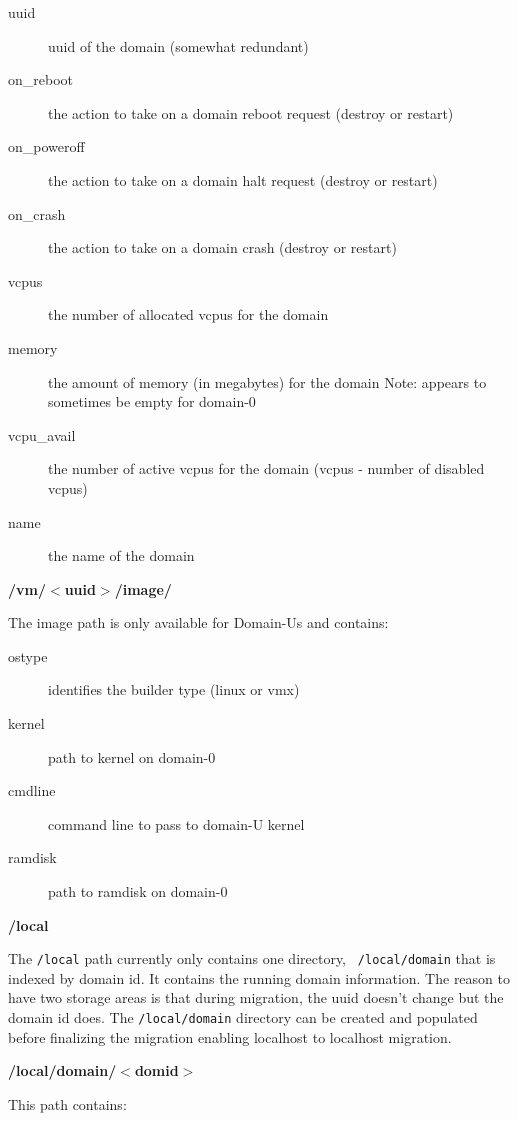 \documentclass[11pt,twoside,final,openright]{report}
\begin{document}
\begin{description}
\item[uuid] uuid of the domain (somewhat redundant)
\item[on\_reboot] the action to take on a domain reboot request (destroy or restart)
\item[on\_poweroff] the action to take on a domain halt request (destroy or restart)
\item[on\_crash] the action to take on a domain crash (destroy or restart)
\item[vcpus] the number of allocated vcpus for the domain
\item[memory] the amount of memory (in megabytes) for the domain Note: appears to sometimes be empty for domain-0
\item[vcpu\_avail] the number of active vcpus for the domain (vcpus - number of disabled vcpus)
\item[name] the name of the domain
\end{description}


{\bf /vm/$<$uuid$>$/image/}

The image path is only available for Domain-Us and contains:
\begin{description}
\item[ostype] identifies the builder type (linux or vmx)
\item[kernel] path to kernel on domain-0
\item[cmdline] command line to pass to domain-U kernel
\item[ramdisk] path to ramdisk on domain-0
\end{description}

{\bf /local}

The {\tt /local} path currently only contains one directory, {\tt
/local/domain} that is indexed by domain id.  It contains the running
domain information.  The reason to have two storage areas is that
during migration, the uuid doesn't change but the domain id does.  The
{\tt /local/domain} directory can be created and populated before
finalizing the migration enabling localhost to localhost migration.

{\bf /local/domain/$<$domid$>$}

This path contains:
\end{document}

